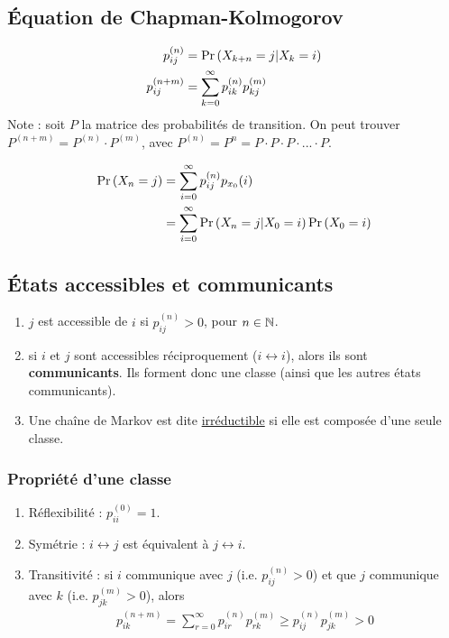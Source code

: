 \documentclass[10pt, french, landscape]{article}
\begin{document}
\begin{multicols*}{2}
\subsection*{Équation de Chapman-Kolmogorov}
\begin{align*}
p_{ij}^{(n)} 	& = \Pr \left( X_{k+n} = j | X_k = i \right) \\
p_{ij}^{(n+m)} 	& = \sum_{k=0}^{\infty} p_{ik}^{(n)} p_{kj}^{(m)} \\
\end{align*}
Note : soit $P$ la matrice des probabilités de transition. On peut trouver $P^{(n+m)} = P^{(n)} \cdot P^{(m)}$, avec $P^{(n)} = P^n = P\cdot P \cdot P \cdot ... \cdot P$.

\begin{align*}
\Pr \left( X_n = j \right) & = \sum_{i=0}^{\infty} p_{ij}^{(n)} p_{x_0}(i) \\
	& = \sum_{i=0}^{\infty} \Pr \left( X_n = j | X_0 = i \right) \Pr \left( X_0 = i \right) \\
\end{align*}

\subsection*{États accessibles et communicants}
\begin{enumerate}[label=\faAngleRight]
\item $j$ est accessible de $i$ si $p_{ij}^{(n)} >0$, pour $n \in \mathbb{N}$.

\item si $i$ et $j$ sont accessibles réciproquement ($i \leftrightarrow i$), alors ils sont \textbf{communicants}. Ils forment donc une classe (ainsi que les autres états communicants).

\item Une chaîne de Markov est dite \underline{irréductible} si elle est composée d'une seule classe.
\end{enumerate}

\subsubsection*{Propriété d'une classe}
\begin{enumerate}[label=\faCheck]
\item Réflexibilité : $p_{ii}^{(0)} = 1$.
\item Symétrie : $i \leftrightarrow j$ est équivalent à $j \leftrightarrow i$.
\item Transitivité : si $i$ communique avec $j$ (i.e. $p_{ij}^{(n)} >0$) et que $j$ communique avec $k$ (i.e. $p_{jk}^{(m)}>0$), alors
\begin{align*}
p_{ik}^{(n+m)} = \sum_{r=0}^{\infty} p_{ir}^{(n)} p_{rk}^{(m)} \geq p_{ij}^{(n)} p_{jk}^{(m)} > 0
\end{align*}
\end{enumerate}


\end{multicols*}
\end{document}
